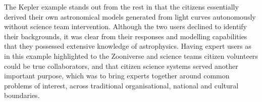 \documentclass{sigchi}
\begin{document}
The Kepler example stands out from the rest in that the citizens essentially derived their own astronomical models generated from light curves autonomously without science team intervention.  Although the two users declined to identify their backgrounds, it was clear from their responses and modelling capabilities that they possessed extensive knowledge of astrophysics. Having expert users as in this example highlighted to the Zooniverse and science teams citizen volunteers could be true collaborators, and that citizen science systems served another important purpose, which was to bring experts together around common problems of interest, across traditional organisational, national and cultural boundaries.


\end{document}

